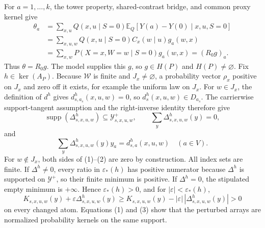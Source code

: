 For \(a=1,\ldots,k\), the tower property, shared-contrast bridge, and common proxy kernel give
\[
\begin{aligned}
\theta_a
&=\sum_{x,u}Q(x,u\mid S=0)
  \mathbb E_Q[Y(a)-Y(0)\mid x,u,S=0]\\
&=\sum_{x,u,w}Q(x,u\mid S=0)C_x(w\mid u)g_a(w,x)\\
&=\sum_{x,w}P(X=x,W=w\mid S=0)g_a(w,x)
=(R_0g)_a.
\end{aligned}
\tag{4}
\]
Thus \(\theta=R_0g\).  The model supplies this \(g\), so \(g\in H(P)\) and \(H(P)\ne\varnothing\).
 Fix \(h\in\ker(A_P)\).  Because \(\mathcal W\) is finite and \(J_x\ne\varnothing\), a probability vector \(\rho_x\) positive on \(J_x\) and zero off it exists, for example the uniform law on \(J_x\).  For \(w\in J_x\), the definition of \(d^h\) gives \(d^h_{s,a_s}(x,u,w)=0\), so \(d^h_s(x,u,w)\in D_{a_s}\).  The carrierwise support-tangent assumption and the right-inverse identity therefore give
\[
\operatorname{supp}(\Delta^h_{s,x,u,w})\subseteq\mathcal Y^+_{s,x,u,w},\qquad
\sum_y\Delta^h_{s,x,u,w}(y)=0,
\tag{1}
\]
and
\[
\sum_y\Delta^h_{s,x,u,w}(y)y_a=d^h_{s,a}(x,u,w)
\quad(a\in V).
\tag{2}
\]
For \(w\notin J_x\), both sides of (1)--(2) are zero by construction.  All index sets are finite.  If \(\Delta^h\ne0\), every ratio in \(\varepsilon_*(h)\) has positive numerator because \(\Delta^h\) is supported on \(\mathcal Y^+\), so their finite minimum is positive.  If \(\Delta^h=0\), the stipulated empty minimum is \(+\infty\).  Hence \(\varepsilon_*(h)>0\), and for \(|\varepsilon|<\varepsilon_*(h)\),
\[
K_{s,x,u,w}(y)+\varepsilon\Delta^h_{s,x,u,w}(y)
\ge K_{s,x,u,w}(y)-|\varepsilon|\,|\Delta^h_{s,x,u,w}(y)|>0
\tag{3}
\]
on every changed atom.  Equations (1) and (3) show that the perturbed arrays are normalized probability kernels on the same support.


